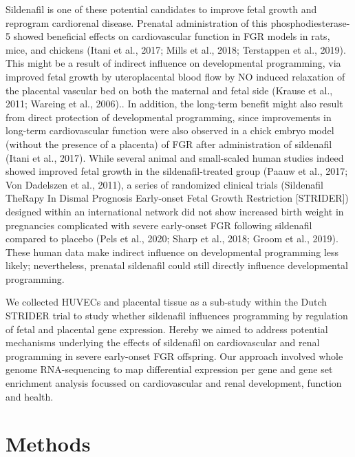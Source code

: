 \documentclass[authordate, empirical]{jote-new-article}
\begin{document}
Sildenafil is one of these potential candidates to improve fetal growth and reprogram cardiorenal disease. Prenatal administration of this phosphodiesterase-5 showed beneficial effects on cardiovascular function in FGR models in rats, mice, and chickens (Itani et al., 2017; Mills et al., 2018; Terstappen et al., 2019). This might be a result of indirect influence on developmental programming, via improved fetal growth by uteroplacental blood flow by NO induced relaxation of the placental vascular bed on both the maternal and fetal side (Krause et al., 2011; Wareing et al., 2006).. In addition, the long-term benefit might also result from direct protection of developmental programming, since improvements in long-term cardiovascular function were also observed in a chick embryo model (without the presence of a placenta) of FGR after administration of sildenafil (Itani et al., 2017). While several animal and small-scaled human studies indeed showed improved fetal growth in the sildenafil-treated group (Paauw et al., 2017; Von Dadelszen et al., 2011), a series of randomized clinical trials (Sildenafil TheRapy In Dismal Prognosis Early-onset Fetal Growth Restriction [STRIDER]) designed within an international network did not show increased birth weight in pregnancies complicated with severe early-onset FGR following sildenafil compared to placebo (Pels et al., 2020; Sharp et al., 2018; Groom et al., 2019). These human data make indirect influence on developmental programming less likely; nevertheless, prenatal sildenafil could still directly influence developmental programming.



We collected HUVECs and placental tissue as a sub-study within the Dutch STRIDER trial to study whether sildenafil influences programming by regulation of fetal and placental gene expression. Hereby we aimed to address potential mechanisms underlying the effects of sildenafil on cardiovascular and renal programming in severe early-onset FGR offspring. Our approach involved whole genome RNA-sequencing to map differential expression per gene and gene set enrichment analysis focussed on cardiovascular and renal development, function and health.







\section{Methods}
\end{document}
